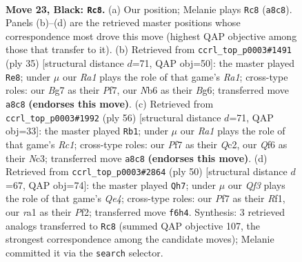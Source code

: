 \documentclass[11pt]{article}
\begin{document}
\clearpage

\begin{figure}[p]\centering
\begin{subfigure}{0.46\textwidth}\centering
\resizebox{\linewidth}{!}{%
\newchessgame
\chessboard[
  setfen={r5k1/pp3pb1/1nn2qp1/3p3p/3P4/6BP/PPB2PP1/RN2Q1K1 b - - 0 23},
  showmover=false,
  pgfstyle=straightmove, color=movearrow, markmove={a8-c8}
]}
\caption{}
\end{subfigure}\hfill
\begin{subfigure}{0.46\textwidth}\centering
\resizebox{\linewidth}{!}{%
\newchessgame
\chessboard[
  setfen={r5k1/1p1q1pp1/p1n2nbp/3p4/N2P1BP1/5P2/PP4BP/2RQ2K1 b - - 2 18},
  showmover=false,
  pgfstyle=straightmove, color=movearrow, markmove={a8-e8}
]}
\caption{}
\end{subfigure}
\\[4pt]
\begin{subfigure}{0.46\textwidth}\centering
\resizebox{\linewidth}{!}{%
\newchessgame
\chessboard[
  setfen={4bnk1/r5p1/1q1bp2p/1p6/2p1B3/2N1PN1P/1PQ2PP1/2R3K1 w - - 0 29},
  showmover=false,
  pgfstyle=straightmove, color=movearrow, markmove={c1-b1}
]}
\caption{}
\end{subfigure}\hfill
\begin{subfigure}{0.46\textwidth}\centering
\resizebox{\linewidth}{!}{%
\newchessgame
\chessboard[
  setfen={1r2nk2/1pqb1pp1/p3p2p/8/P2NQ3/1P2PB1P/5PP1/5RK1 w - - 0 26},
  showmover=false,
  pgfstyle=straightmove, color=movearrow, markmove={e4-h7}
]}
\caption{}
\end{subfigure}
\caption{\textbf{Move 23, Black: \texttt{Rc8}.} (a) Our position; Melanie plays \texttt{Rc8} (\texttt{a8c8}). Panels (b)--(d) are the retrieved master positions whose correspondence most drove this move (highest QAP objective among those that transfer to it). (b) Retrieved from \texttt{ccrl\_top\_p0003\#1491} (ply 35) [structural distance $d$=71, QAP obj=50]: the master played \texttt{Re8}; under $\mu$ our \emph{Ra1} plays the role of that game's \emph{Ra1}; cross-type roles: our \emph{B}g7 as their \emph{P}f7, our \emph{N}b6 as their \emph{B}g6; transferred move \texttt{a8c8} \textbf{(endorses this move)}. (c) Retrieved from \texttt{ccrl\_top\_p0003\#1992} (ply 56) [structural distance $d$=71, QAP obj=33]: the master played \texttt{Rb1}; under $\mu$ our \emph{Ra1} plays the role of that game's \emph{Rc1}; cross-type roles: our \emph{P}f7 as their \emph{Q}c2, our \emph{Q}f6 as their \emph{N}c3; transferred move \texttt{a8c8} \textbf{(endorses this move)}. (d) Retrieved from \texttt{ccrl\_top\_p0003\#2864} (ply 50) [structural distance $d$=67, QAP obj=74]: the master played \texttt{Qh7}; under $\mu$ our \emph{Qf3} plays the role of that game's \emph{Qe4}; cross-type roles: our \emph{P}f7 as their \emph{R}f1, our \emph{r}a1 as their \emph{P}f2; transferred move \texttt{f6h4}. Synthesis: 3 retrieved analogs transferred to \texttt{Rc8} (summed QAP objective 107, the strongest correspondence among the candidate moves); Melanie committed it via the \texttt{search} selector.}
\label{fig:thought-m45}
\end{figure}
\end{document}
